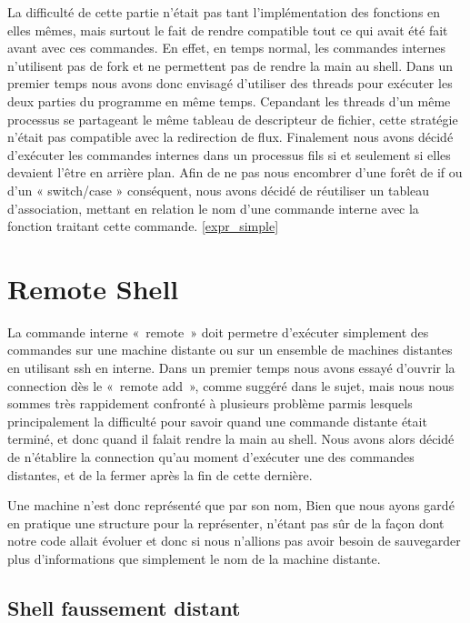 \documentclass[12pt]{article}
\begin{document}
 La difficulté de cette partie n'était pas tant l'implémentation des fonctions en elles mêmes,
 mais surtout le fait de rendre compatible tout ce qui avait été fait avant avec ces commandes.
 En effet, en temps normal, les commandes internes n'utilisent pas de fork et ne permettent pas
 de rendre la main au shell. Dans un premier temps nous avons donc envisagé d'utiliser des threads
 pour exécuter les deux parties du programme en même temps. Cepandant les threads d'un même processus
 se partageant le même tableau de descripteur de fichier, cette stratégie n'était pas compatible
 avec la redirection de flux. Finalement nous avons décidé d'exécuter les commandes internes dans
 un processus fils si et seulement si elles devaient l'être en arrière plan.
 Afin de ne pas nous encombrer d'une forêt de if ou d'un « switch/case » conséquent, nous avons
 décidé de réutiliser un tableau d'association, mettant en relation le nom d'une commande interne
 avec la fonction traitant cette commande.  \ref{expr_simple}
 

\newpage
\section{Remote Shell}

La commande interne «~remote~» doit permetre d'exécuter simplement des commandes sur une machine
distante ou sur un ensemble de machines distantes en utilisant ssh en interne. Dans un premier 
temps nous avons essayé d'ouvrir la connection dès le «~remote add~», comme suggéré dans le 
sujet, mais nous nous sommes très rappidement confronté à plusieurs problème parmis lesquels
principalement la difficulté pour savoir quand une commande distante était terminé, et donc quand
il falait rendre la main au shell. Nous avons alors décidé de n'établire la connection qu'au moment
d'exécuter une des commandes distantes, et de la fermer après la fin de cette dernière.\newline

Une machine n'est donc représenté que par son nom, Bien que nous ayons gardé en pratique une
structure pour la représenter, n'étant pas sûr de la façon dont notre code allait évoluer et
donc si nous n'allions pas avoir besoin de sauvegarder plus d'informations que simplement le
nom de la machine distante.


\subsection{Shell faussement distant}
\end{document}
